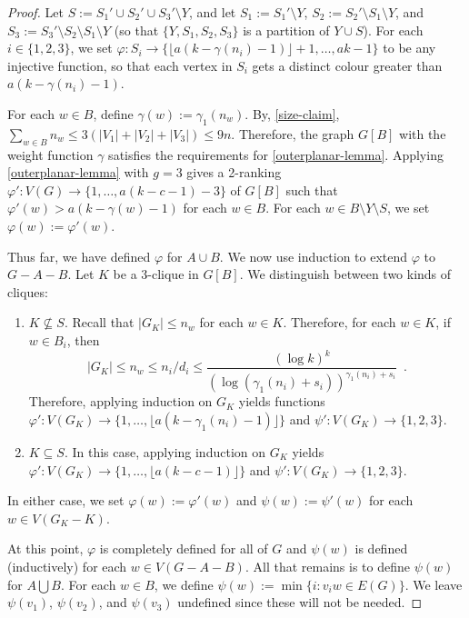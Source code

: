 \documentclass[kpfonts]{patmorin}
\theoremstyle{named}
\begin{document}
\begin{proof}
    Let $S:=S_1'\cup S_2'\cup S_3'\setminus Y$, and let $S_1:=S_1'\setminus Y$, $S_2:=S_2'\setminus S_1\setminus Y$, and $S_3:=S_3'\setminus S_2\setminus S_1\setminus Y$ (so that $\{Y,S_1,S_2,S_3\}$ is a partition of $Y\cup S$).    For each $i\in\{1,2,3\}$, we set $\varphi:S_i\to\{\lfloor a(k-\gamma(n_i)-1)\rfloor+1,\ldots,ak-1\}$ to be any injective function, so that each vertex in $S_i$ gets a distinct colour greater than $a(k-\gamma(n_i)-1)$.

    For each $w\in B$, define $\gamma(w):=\gamma_1(n_w)$.  By, \cref{size-claim}, $\sum_{w\in B}n_w\le 3(|V_1|+|V_2|+|V_3|)\le 9n$.  Therefore, the graph $G[B]$ with the weight function $\gamma$ satisfies the requirements for \cref{outerplanar-lemma}. Applying \cref{outerplanar-lemma} with $g=3$ gives a 2-ranking $\varphi':V(G)\to \{1,\ldots,a(k-c-1)-3\}$ of $G[B]$ such that $\varphi'(w)> a(k-\gamma(w)-1)$ for each $w\in B$.  For each $w\in B\setminus Y\setminus S$, we set $\varphi(w):=\varphi'(w)$.

    Thus far, we have defined $\varphi$ for $A\cup B$.  We now use induction to extend $\varphi$ to $G-A-B$.  Let $K$ be a 3-clique in $G[B]$.  We distinguish between two kinds of cliques:
    \begin{enumerate}
        \item $K\not\subseteq S$. Recall that $|G_K|\le n_w$ for each $w\in K$.  Therefore, for each $w\in K$, if $w\in B_i$, then
        \[
            |G_K| \le n_w
                  \le n_i/d_i
                  \le \frac{(\log k)^k}{(\log (\gamma_1(n_i)+s_i))^{\gamma_1(n_i)+s_i}} \enspace .
        \]
        Therefore, applying induction on $G_K$ yields functions $\varphi':V(G_K)\to\{1,\ldots,\lfloor a(k-\gamma_1(n_i)-1)\rfloor\}$ and $\psi':V(G_K)\to\{1,2,3\}$.

        \item $K\subseteq S$. In this case, applying induction on $G_K$ yields
        $\varphi':V(G_K)\to\{1,\ldots,\lfloor a(k-c-1)\rfloor\}$ and $\psi':V(G_K)\to\{1,2,3\}$.
    \end{enumerate}
    In either case, we set $\varphi(w):=\varphi'(w)$ and $\psi(w):=\psi'(w)$ for each $w\in V(G_K-K)$.

    At this point, $\varphi$ is completely defined for all of $G$ and $\psi(w)$ is defined (inductively) for each $w\in V(G-A-B)$.  All that remains is to define $\psi(w)$ for $A\bigcup B$.  For each $w\in B$, we define $\psi(w):=\min\{i:v_iw\in E(G)\}$.  We leave $\psi(v_1)$, $\psi(v_2)$, and $\psi(v_3)$ undefined since these will not be needed.








\end{proof}
\end{document}

